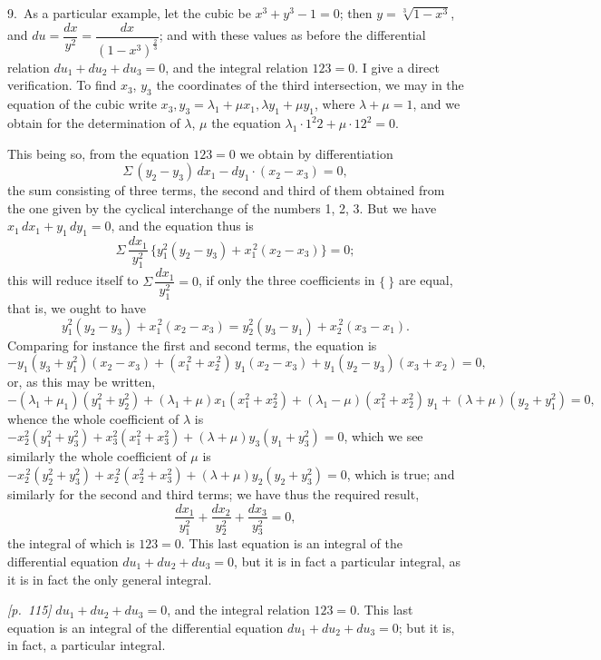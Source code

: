 \documentclass[11pt,a4paper]{article}
\theoremstyle{plain}
\theoremstyle{definition}
\theoremstyle{remark}
\begin{document}
9.\ As a particular example, let the cubic be $x^3 + y^3 - 1 = 0$; then $y = \sqrt[3]{1 - x^3}$, and $du = \dfrac{dx}{y^2} = \dfrac{dx}{(1 - x^3)^{\frac{2}{3}}}$; and with these values as before the differential relation $du_1 + du_2 + du_3 = 0$, and the integral relation $123 = 0$. I give a direct verification. To find $x_3$, $y_3$ the coordinates of the third intersection, we may in the equation of the cubic write $x_3, y_3 = \lambda_1 + \mu x_1, \lambda y_1 + \mu y_1$, where $\lambda + \mu = 1$, and we obtain for the determination of $\lambda$, $\mu$ the equation $\lambda_1\cdot 1^2 2 + \mu\cdot 1 2^2 = 0$.

This being so, from the equation $123 = 0$ we obtain by differentiation
\[
\Sigma\,(y_2 - y_3)\,dx_1 - dy_1\cdot(x_2 - x_3) = 0,
\]
the sum consisting of three terms, the second and third of them obtained from the one given by the cyclical interchange of the numbers 1, 2, 3. But we have $x_1\,dx_1 + y_1\,dy_1 = 0$, and the equation thus is
\[
\Sigma\,\frac{dx_1}{y_1^2}\,\{y_1^2 (y_2 - y_3) + x_1^{\,2}(x_2 - x_3)\} = 0;
\]
this will reduce itself to $\Sigma\,\dfrac{dx_1}{y_1^2} = 0$, if only the three coefficients in $\{\ \}$ are equal, that is, we ought to have
\[
y_1^2(y_2 - y_3) + x_1^{\,2}(x_2 - x_3) = y_2^2(y_3 - y_1) + x_2^{\,2}(x_3 - x_1).
\]
Comparing for instance the first and second terms, the equation is
\[
- y_1(y_3 + y_1^2)(x_2 - x_3) + (x_1^{\,2} + x_2^{\,2})\,y_1(x_2 - x_3) + y_1(y_2 - y_3)(x_3 + x_2) = 0,
\]
or, as this may be written,
\[
- (\lambda_1 + \mu_1)(y_1^2 + y_2^2) + (\lambda_1 + \mu)x_1(x_1^2 + x_2^2) + (\lambda_1 - \mu)(x_1^2 + x_2^2)\,y_1 + (\lambda + \mu)(y_2 + y_1^2) = 0,
\]
whence the whole coefficient of $\lambda$ is $- x_2^2(y_1^2 + y_3^2) + x_3^2(x_1^2 + x_3^2) + (\lambda + \mu)y_3(y_1 + y_3^2) = 0$, which we see similarly the whole coefficient of $\mu$ is $- x_2^{\,2}(y_2^2 + y_3^2) + x_2^{\,2}(x_2^2 + x_3^2) + (\lambda + \mu)y_2(y_2 + y_3^2) = 0$, which is true; and similarly for the second and third terms; we have thus the required result,
\[
\frac{dx_1}{y_1^2} + \frac{dx_2}{y_2^2} + \frac{dx_3}{y_3^2} = 0,
\]
the integral of which is $123 = 0$. This last equation is an integral of the differential equation $du_1 + du_2 + du_3 = 0$, but it is in fact a particular integral, as it is in fact the only general integral.

\noindent\textit{[p.~115]} $du_1 + du_2 + du_3 = 0$, and the integral relation $123 = 0$. This last equation is an integral of the differential equation $du_1 + du_2 + du_3 = 0$; but it is, in fact, a particular integral.
\end{document}
